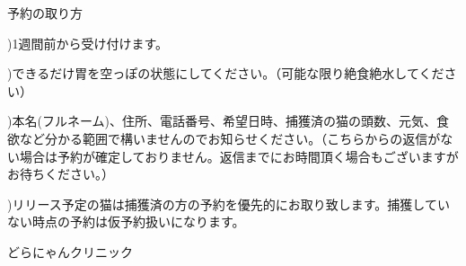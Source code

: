 \documentclass[b5paper]{jsarticle}
\begin{document}
\huge

予約の取り方\vspace{20pt}

\Large


)1週間前から受け付けます。\vspace{5pt}

)できるだけ胃を空っぽの状態にしてください。（可能な限り絶食絶水してください）\vspace{5pt}

)本名(フルネーム)、住所、電話番号、希望日時、捕獲済の猫の頭数、元気、食欲など分かる範囲で構いませんのでお知らせください。（こちらからの返信がない場合は予約が確定しておりません。返信までにお時間頂く場合もございますがお待ちください。）\vspace{5pt}

)リリース予定の猫は捕獲済の方の予約を優先的にお取り致します。捕獲していない時点の予約は仮予約扱いになります。\vspace{5pt}


\vspace{25pt}
\flushright どらにゃんクリニック
\end{document}
